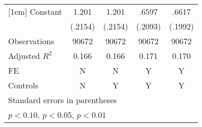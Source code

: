 \begin{table}[htbp]
\begin{tabular}{l*{4}{c}}
[1em]
Constant            &       1.201\sym{***}&       1.201\sym{***}&       .6597\sym{***}&       .6617\sym{***}\\
                    &     (.2154)         &     (.2154)         &     (.2093)         &     (.1992)         \\
\hline
Observations        &       90672         &       90672         &       90672         &       90672         \\
Adjusted \(R^{2}\)  &       0.166         &       0.166         &       0.171         &       0.170         \\
FE                  &           N         &           N         &           Y         &           Y         \\
Controls            &           N         &           Y         &           Y         &           Y         \\
\hline\hline
\multicolumn{5}{l}{\footnotesize Standard errors in parentheses}\\
\multicolumn{5}{l}{\footnotesize \sym{*} \(p<0.10\), \sym{**} \(p<0.05\), \sym{***} \(p<0.01\)}\\
\end{tabular}
\end{table}
